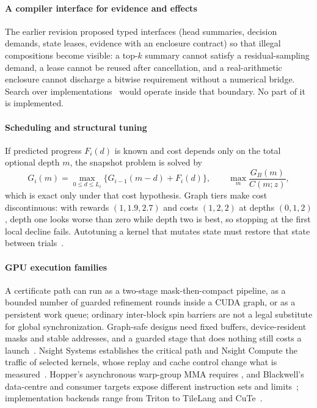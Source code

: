 \paragraph{A compiler interface for evidence and effects} The earlier revision proposed typed interfaces (head summaries, decision demands, state leases, evidence with an enclosure contract) so that illegal compositions become visible: a top-$k$ summary cannot satisfy a residual-sampling demand, a lease cannot be reused after cancellation, and a real-arithmetic enclosure cannot discharge a bitwise requirement without a numerical bridge. Search over implementations~\cite{mirage} would operate inside that boundary. No part of it is implemented.

\paragraph{Scheduling and structural tuning} If predicted progress $F_i(d)$ is known and cost depends only on the total optional depth $m$, the snapshot problem is solved by
\begin{equation}
G_i(m)=\max_{0\le d\le L_i}\{G_{i-1}(m-d)+F_i(d)\},\qquad\max_m\frac{G_B(m)}{C(m;z)},\label{eq:schedDP}
\end{equation}
which is exact only under that cost hypothesis. Graph tiers make cost discontinuous: with rewards $(1,1.9,2.7)$ and costs $(1,2,2)$ at depths $(0,1,2)$, depth one looks worse than zero while depth two is best, so stopping at the first local decline fails. Autotuning a kernel that mutates state must restore that state between trials~\cite{tritonautotune}.

\paragraph{GPU execution families} A certificate path can run as a two-stage mask-then-compact pipeline, as a bounded number of guarded refinement rounds inside a CUDA graph, or as a persistent work queue; ordinary inter-block spin barriers are not a legal substitute for global synchronization. Graph-safe designs need fixed buffers, device-resident masks and stable addresses, and a guarded stage that does nothing still costs a launch~\cite{vllmgraphs}. Nsight Systems establishes the critical path and Nsight Compute the traffic of selected kernels, whose replay and cache control change what is measured~\cite{nsight}. Hopper's asynchronous warp-group MMA requires , and Blackwell's data-centre and consumer targets expose different instruction sets and limits~\cite{ptxisa,hopper,blackwell}; implementation backends range from Triton to TileLang and CuTe~\cite{cute,tilelang,tritonautotune}.


